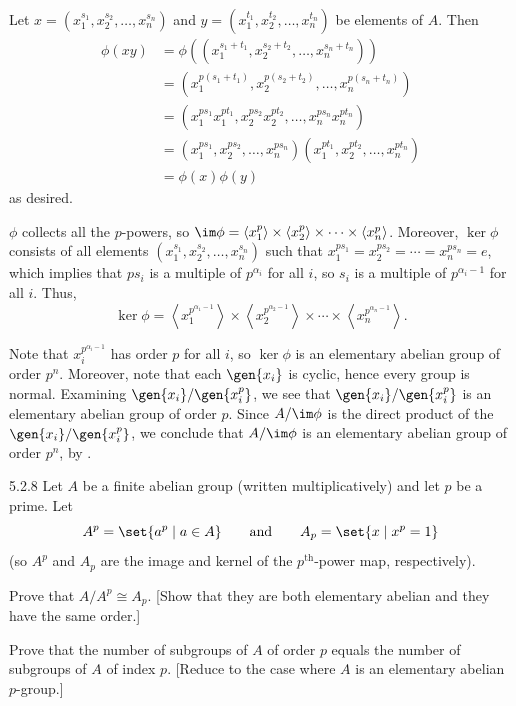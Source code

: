 \begin{solenum}
    \item Let $x = (x_1^{s_1}, x_2^{s_2}, \ldots, x_n^{s_n})$ and $y = (x_1^{t_1}, x_2^{t_2}, \ldots, x_n^{t_n})$ be elements of $A$.
	Then
    \begin{align*}
        \phi(xy) & = \phi((x_1^{s_1 + t_1}, x_2^{s_2 + t_2}, \ldots, x_n^{s_n + t_n})) \\
        & = (x_1^{p(s_1 + t_1)}, x_2^{p(s_2 + t_2)}, \ldots, x_n^{p(s_n + t_n)}) \\
        & = (x_1^{ps_1} x_1^{pt_1}, x_2^{ps_2} x_2^{pt_2}, \ldots, x_n^{ps_n} x_n^{pt_n}) \\
        & = (x_1^{ps_1}, x_2^{ps_2}, \ldots, x_n^{ps_n})(x_1^{pt_1}, x_2^{pt_2}, \ldots, x_n^{pt_n}) \\
        & = \phi(x)\phi(y)
    \end{align*}
    as desired.
    \item $\phi$ collects all the $p$-powers, so $\im\phi = \langle x_1^p \rangle \times \langle x_2^p \rangle \times \cdots \times \langle x_n^p \rangle$.
	Moreover, $\ker\phi$ consists of all elements $(x_1^{s_1}, x_2^{s_2}, \ldots, x_n^{s_n})$ such that $x_1^{ps_1} = x_2^{ps_2} = \cdots = x_n^{ps_n} = e$, which implies that $ps_i$ is a multiple of $p^{\alpha_i}$ for all $i$, so $s_i$ is a multiple of $p^{\alpha_i - 1}$ for all $i$.
	Thus,
    \[
    	\ker\phi = \left\langle x_1^{p^{\alpha_1-1}} \right\rangle \times \left\langle x_2^{p^{\alpha_2-1}} \right\rangle \times \cdots \times \left\langle x_n^{p^{\alpha_n-1}} \right\rangle.
    \]
    \item Note that $x_i^{p^{\alpha_i - 1}}$ has order $p$ for all $i$, so $\ker\phi$ is an elementary abelian group of order $p^n$.
	Moreover, note that each $\gen{x_i}$ is cyclic, hence every group is normal.
	Examining $\gen{x_i} / \gen{x_i^p}$, we see that $\gen{x_i} / \gen{x_i^p}$ is an elementary abelian group of order $p$.
	Since $A / \im\phi$ is the direct product of the $\gen{x_i} / \gen{x_i^p}$, we conclude that $A / \im\phi$ is an elementary abelian group of order $p^n$, by .
\end{solenum}

\begin{exercise}{5.2.8}
    Let $A$ be a finite abelian group (written multiplicatively) and let $p$ be a prime.
	Let
    \[
    	A^p = \set{a^p \mid a \in A} \qquad \text{and} \qquad A_p = \set{x \mid x^p = 1}
    \]
    (so $A^p$ and $A_p$ are the image and kernel of the $p^{\text{th}}$-power map, respectively).
    \begin{subexercises}
        \item Prove that $A/A^p \cong A_p$. [Show that they are both elementary abelian and they have the same order.]
        \item Prove that the number of subgroups of $A$ of order $p$ equals the number of subgroups of $A$ of index $p$. [Reduce to the case where $A$ is an elementary abelian $p$-group.]
    \end{subexercises}
\end{exercise}

